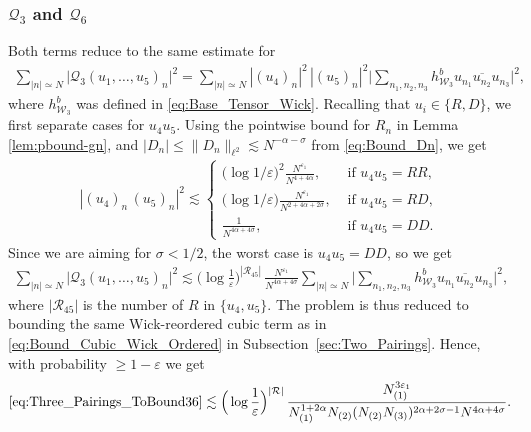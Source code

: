 \documentclass[11pt, xcolor = dvipsnames,reqno
]{amsart}
\theoremstyle{definition}
\theoremstyle{remark}
\begin{document}
    \subsubsection{$\mathcal Q_3$ and $\mathcal Q_6$}
    Both terms reduce to the same estimate for 
    \begin{align}
    \label{eq:Three_Pairings_ToBound36}
        \sum_{|n| \simeq N}  \big| \mathcal{Q}_3(u_1, \ldots, u_5)_n \big|^2
        = 
        \sum_{|n| \simeq N}  |(u_4)_n|^2 \, |(u_5)_n|^2  \bigg| \sum_{n_1,n_2,n_3} h^b_{\mathcal{W}_3} u_{n_1} \overline{u_{n_2}} u_{n_3} \bigg|^2,
    \end{align}
    where $h^b_{\mathcal W_3}$ was defined in \eqref{eq:Base_Tensor_Wick}. 
    Recalling that $u_i \in \{ R, D \}$, we first separate cases for $u_4 u_5$. 
    Using the pointwise bound for $R_n$ in Lemma \ref{lem:pbound-gn},
    and $|D_n| \leq \lVert D_n \rVert_{\ell^2} \lesssim N^{-\alpha - \sigma}$ from \eqref{eq:Bound_Dn}, we get 
    \begin{align}
        |(u_4)_n \, (u_5)_n|^2 
        \lesssim  
        \begin{cases}
            \displaystyle \big(\log 1/\varepsilon \big)^2 \frac{N^{\varepsilon_1}}{N^{4 + 4\alpha}}, & \text{ if } u_4 u_5 = RR, \\
            \displaystyle \big(\log 1/\varepsilon \big) \frac{N^{\varepsilon_1}}{N^{2 + 4\alpha  + 2\sigma}}, & \text{ if } u_4 u_5 = RD, \\
            \displaystyle \frac{1}{N^{4\alpha + 4\sigma}}, & \text{ if } u_4 u_5 = DD.
        \end{cases}
    \end{align}
    Since we are aiming for $\sigma < 1/2$, the worst case is $u_4u_5 = DD$, so we get 
    \begin{align}
        \sum_{|n| \simeq N}  \big| \mathcal{Q}_3(u_1, \ldots, u_5)_n \big|^2
        \lesssim  
        \Big(\log  \frac{1}{\varepsilon} \Big)^{|\mathcal R_{45}|}
        \,  \frac{N^{\varepsilon_1}}{N^{4\alpha + 4\sigma}} 
        \sum_{|n| \simeq N}   \bigg| \sum_{n_1,n_2,n_3} h^b_{\mathcal{W}_3} u_{n_1} \overline{u_{n_2}} u_{n_3} \bigg|^2,
    \end{align}
    where $|\mathcal R_{45}|$ is the number of $R$ in $\{u_4, u_5\}$.
    The problem is thus reduced to bounding the same Wick-reordered cubic term as in \eqref{eq:Bound_Cubic_Wick_Ordered} in Subsection~\ref{sec:Two_Pairings}. 
    Hence, with probability $\geq 1 - \varepsilon$ we get
    \begin{equation}
        \eqref{eq:Three_Pairings_ToBound36}
        \lesssim 
        \Big(\log  \frac{1}{\varepsilon} \Big)^{|\mathcal R|} \, 
        \frac{N_{(1)}^{3\varepsilon_1}}{ N_{(1)}^{1+2\alpha} N_{(2)}  (N_{(2)} N_{(3)})^{2\alpha + 2\sigma - 1} N^{4\alpha + 4\sigma }}.
    \end{equation}
\end{document}
